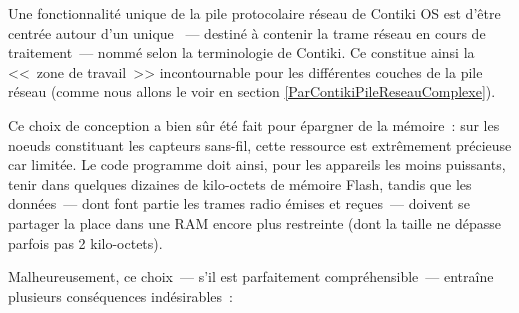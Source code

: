 Une fonctionnalité unique de la pile protocolaire réseau de Contiki OS
est d'être centrée autour d'un unique ~--- destiné à contenir
la trame réseau en cours de traitement~--- nommé 
selon la terminologie de Contiki. Ce  constitue ainsi
la <<~zone de travail~>> incontournable pour les différentes couches
de la pile réseau (comme nous allons le voir en section
\vref{ParContikiPileReseauComplexe}).

Ce choix de conception a bien sûr été fait pour épargner de la mémoire~:
sur les noeuds constituant les capteurs sans-fil, cette ressource est
extrêmement précieuse car limitée. Le code programme doit ainsi, pour les
appareils les moins puissants, tenir dans quelques dizaines de kilo-octets
de mémoire Flash, tandis que les données~--- dont font partie les trames
radio émises et reçues~--- doivent se partager la place dans une RAM encore
plus restreinte (dont la taille ne dépasse parfois pas 2 kilo-octets).

\medskip

Malheureusement, ce choix~--- s'il est parfaitement compréhensible~---
entraîne plusieurs conséquences indésirables~:

